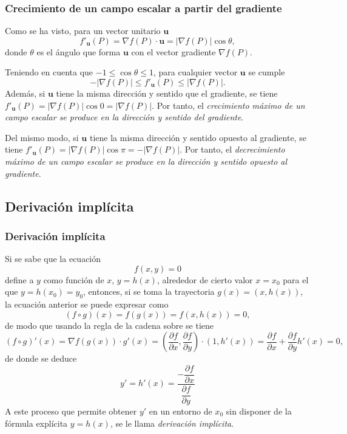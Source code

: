 \begin{frame}
	\frametitle{Crecimiento de un campo escalar a partir del gradiente}
	Como se ha visto, para un vector unitario $\mathbf{u}$
	\[
		f'_{\mathbf{u}}(P) = \nabla f(P)\cdot \mathbf{u} = |\nabla f(P)|\cos \theta,
	\] 
	donde $\theta$ es el ángulo que forma $\mathbf{u}$ con el vector gradiente $\nabla f(P)$.
	
	Teniendo en cuenta que $-1\leq \cos\theta\leq 1$, para cualquier vector $\mathbf{u}$ se cumple 
	\[
		-|\nabla f(P)|\leq f'_{\mathbf{u}}(P)\leq |\nabla f(P)|.
	\]
	Además, si $\mathbf{u}$ tiene la misma dirección y sentido que el gradiente, se tiene $f'_{\mathbf{u}}(P)=|\nabla f(P)|\cos 0=|\nabla f(P)|$. 
	Por tanto, el \alert{\emph{crecimiento máximo de un campo escalar se produce en la dirección y sentido del gradiente}}.
	
	Del mismo modo, si $\mathbf{u}$ tiene la misma dirección y sentido opuesto al gradiente, se tiene $f'_{\mathbf{u}}(P)=|\nabla f(P)|\cos \pi=-|\nabla f(P)|$. 
	Por tanto, el \alert{\emph{decrecimiento máximo de un campo escalar se produce en la dirección y sentido opuesto al gradiente}}.  
\end{frame}


\subsection{Derivación implícita}
\begin{frame}
	\frametitle{Derivación implícita}
	Si se sabe que la ecuación 
	\[
		f(x,y)=0
	\]
	define a $y$ como función de $x$, $y=h(x)$, alrededor de cierto valor $x=x_0$ para el que $y=h(x_0)=y_0$, entonces, si se toma la trayectoria $g(x)=(x,h(x))$, la ecuación anterior se puede expresar como
	\[
		(f\circ g)(x) = f(g(x)) = f(x,h(x))=0,
	\]
	de modo que usando la regla de la cadena sobre se tiene
	\[
		(f\circ g)'(x) = \nabla f(g(x))\cdot g'(x) = \left(\frac{\partial f}{\partial x}, \frac{\partial f}{\partial y}\right)\cdot (1,h'(x)) = 
		\frac{\partial f}{\partial x}+\frac{\partial f}{\partial y}h'(x) = 0,
	\] 
	de donde se deduce
	\[
		y'=h'(x)=\frac{-\dfrac{\partial f}{\partial x}}{\dfrac{\partial f}{\partial y}}
	\]
	A este proceso que permite obtener $y'$ en un entorno de $x_0$ sin disponer de la fórmula explícita $y=h(x)$, se le llama \emph{derivación implícita}.
\end{frame}


